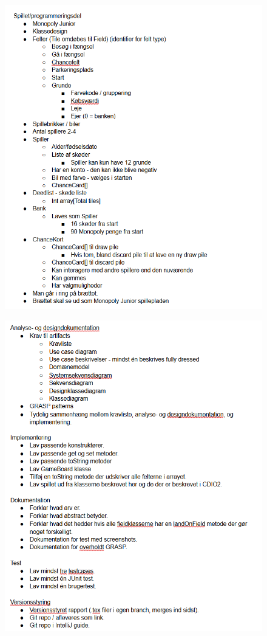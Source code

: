\begin{figure}[h!]
\includegraphics[scale=1]{artifacts/Krav1.png}
\end{figure}
\begin{figure}[h!]
\includegraphics[scale=1]{artifacts/Krav2.png}
\end{figure}
